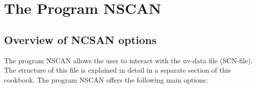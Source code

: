 %
%
%
%
\chapter{The Program NSCAN} 
\tableofcontents 


\section{Overview of NCSAN options} 
\label{nscan.descr.options} 

The program NSCAN allows the user to interact with the uv-data file (SCN-file). 
The structure of this file is explained in detail in a separate section of this
cookbook. The program NSCAN offers the following main options: 

